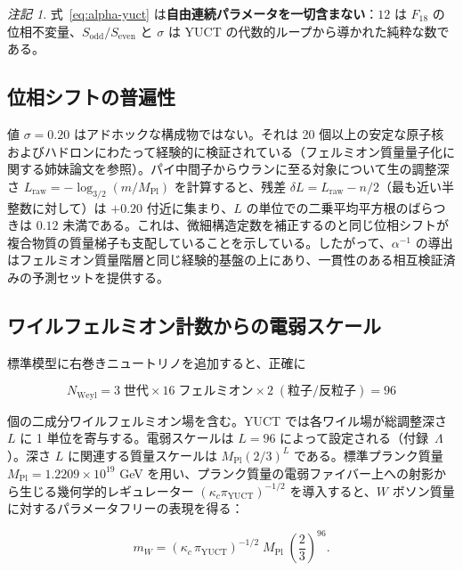 \documentclass[12pt,a4paper]{article}
\theoremstyle{remark}
\newtheorem{remark}[theorem]{注記}
\begin{document}
	\begin{remark}
		式~\eqref{eq:alpha-yuct} は\textbf{自由連続パラメータを一切含まない}：\(12\) は \(F_{18}\) の位相不変量、\(S_{\mathrm{odd}}/S_{\mathrm{even}}\) と \(\sigma\) は YUCT の代数的ループから導かれた純粋な数である。
	\end{remark}
	
	\subsection{位相シフトの普遍性}
	
	値 \(\sigma = 0.20\) はアドホックな構成物ではない。それは 20 個以上の安定な原子核およびハドロンにわたって経験的に検証されている（フェルミオン質量量子化に関する姉妹論文を参照）。パイ中間子からウランに至る対象について生の調整深さ \(L_{\mathrm{raw}} = -\log_{3/2}(m/M_{\mathrm{Pl}})\) を計算すると、残差 \(\delta L = L_{\mathrm{raw}} - n/2\)（最も近い半整数に対して）は \(+0.20\) 付近に集まり、\(L\) の単位での二乗平均平方根のばらつきは \(0.12\) 未満である。これは、微細構造定数を補正するのと同じ位相シフトが複合物質の質量梯子も支配していることを示している。したがって、\(\alpha^{-1}\) の導出はフェルミオン質量階層と同じ経験的基盤の上にあり、一貫性のある相互検証済みの予測セットを提供する。
	
	\subsection{ワイルフェルミオン計数からの電弱スケール}
	
	標準模型に右巻きニュートリノを追加すると、正確に
	
	\begin{equation}
		N_{\mathrm{Weyl}} = 3\;\text{世代} \times 16\;\text{フェルミオン}
		\times 2\;(\text{粒子/反粒子}) = 96
	\end{equation}
	
	個の二成分ワイルフェルミオン場を含む。YUCT では各ワイル場が総調整深さ \(L\) に 1 単位を寄与する。電弱スケールは \(L = 96\) によって設定される（付録~\(\Lambda\)）。深さ \(L\) に関連する質量スケールは \(M_{\mathrm{Pl}} (2/3)^{L}\) である。標準プランク質量 \(M_{\mathrm{Pl}} = 1.2209 \times 10^{19}\) GeV を用い、プランク質量の電弱ファイバー上への射影から生じる幾何学的レギュレーター \((\kappa_c \pi_{\mathrm{YUCT}})^{-1/2}\) を導入すると、\(W\) ボソン質量に対するパラメータフリーの表現を得る：
	
	\begin{equation}
		\boxed{m_W = \left( \kappa_c \, \pi_{\mathrm{YUCT}} \right)^{-1/2}
			\; M_{\mathrm{Pl}} \; \left( \frac{2}{3} \right)^{96}}.
		\label{eq:mw-corrected}
	\end{equation}
	
\end{document}

